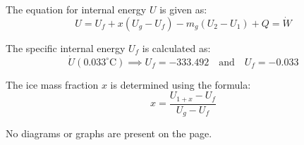 The equation for internal energy \( U \) is given as:  
\[
U = U_f + x \left( U_g - U_f \right) - m_g \left( U_2 - U_1 \right) + Q = \dot{W}
\]  

The specific internal energy \( U_f \) is calculated as:  
\[
\dot{U}(0.033^\circ \text{C}) \implies U_f = -333.492 \quad \text{and} \quad U_f = -0.033
\]  

The ice mass fraction \( x \) is determined using the formula:  
\[
x = \frac{U_{1+x} - U_f}{U_g - U_f}
\]  

No diagrams or graphs are present on the page.